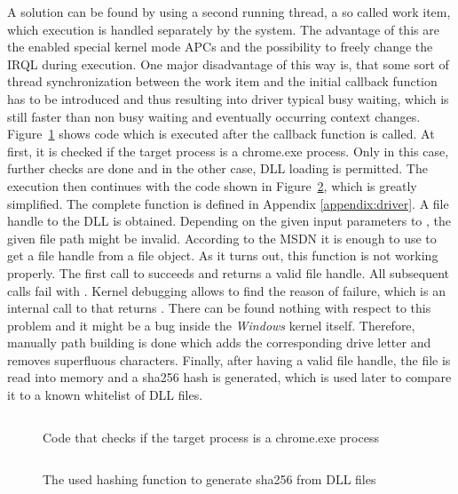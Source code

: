 A solution can be found by using a second running thread, a so called work item, which execution is handled separately by the system. The advantage of this are the enabled special kernel mode \glspl{APC} and the possibility to freely change the \gls{IRQL} during execution. One major disadvantage of this way is, that some sort of thread synchronization between the work item and the initial callback function has to be introduced and thus resulting into driver typical busy waiting, which is still faster than non busy waiting and eventually occurring context changes. Figure~\ref{code:code4} shows code which is executed after the callback function is called. At first, it is checked if the target process is a chrome.exe process. Only in this case, further checks are done and in the other case, \gls{DLL} loading is permitted. The execution then continues with the code shown in Figure~\ref{code:code5}, which is greatly simplified. The complete function is defined in Appendix \ref{appendix:driver}. A file handle to the \gls{DLL} is obtained. Depending on the given input parameters to , the given file path might be invalid. According to the \gls{MSDN} it is enough to use  to get a file handle from a file object. As it turns out, this function is not working properly. The first call to  succeeds and returns a valid file handle. All subsequent calls fail with . Kernel debugging allows to find the reason of failure, which is an internal call to  that returns . There can be found nothing with respect to this problem and it might be a bug inside the \emph{Windows} kernel itself. Therefore, manually path building is done which adds the corresponding drive letter and removes superfluous characters. Finally, after having a valid file handle, the file is read into memory and a sha256 \cite{eckert2014sicherheit} hash is generated, which is used later to compare it to a known whitelist of \gls{DLL} files.

\begin{figure}[h]
\inputminted[breakanywhere, breaklines,fontsize=\scriptsize, frame=single, mathescape, linenos, numbersep=5pt, numbersep=5pt, xleftmargin=0pt]{c}{sections/implementation/code4.c}
\caption{Code that checks if the target process is a chrome.exe process}
\label{code:code4}
\end{figure}

\begin{figure}[h]
\inputminted[breakanywhere, breaklines,fontsize=\scriptsize, frame=single, mathescape, linenos, numbersep=5pt, numbersep=5pt, xleftmargin=0pt]{c}{sections/implementation/code5.c}
\caption{The used hashing function to generate sha256 from \gls{DLL} files}
\label{code:code5}
\end{figure}
\medskip

